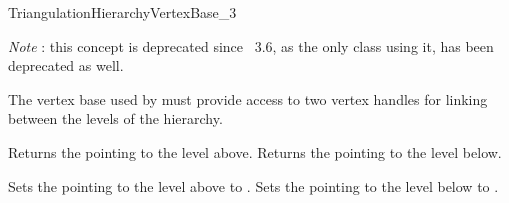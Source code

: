 
\begin{ccRefConcept}{TriangulationHierarchyVertexBase_3}

\begin{ccDeprecated}

{\em Note} : this concept is deprecated since \cgal\ 3.6, as the only class using
it,  has been deprecated as well.

\ccDefinition

The vertex base used by  must provide
access to two vertex handles for linking between the levels of the hierarchy.



\ccAccessFunctions
{}
\ccTagFullDeclarations

{Returns the  pointing to the level above.}
\ccGlue
{}
{Returns the  pointing to the level below.}


{Sets the  pointing to the level above to .}
\ccGlue
{}
{Sets the  pointing to the level below to .}

\ccHasModels



\end{ccDeprecated}

\end{ccRefConcept}
